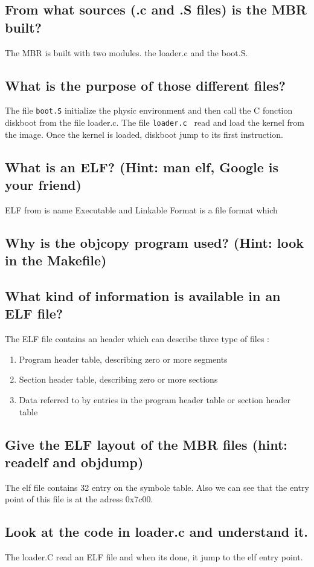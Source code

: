 \documentclass[10]{article}
\begin{document}
\subsection{From what sources (.c and .S files) is the MBR built?}
	The MBR is built  with two modules. 
	the loader.c and the  boot.S.
	
\subsection{What is the purpose of those different files?}
	The file   \texttt{boot.S}  initialize the physic environment and then call the C fonction diskboot from the file loader.c.
	The file  \texttt{loader.c } read and load the kernel from the image. Once the kernel is loaded, diskboot jump to its first instruction.
\subsection{What is an ELF? (Hint: man elf, Google is your friend)}
	ELF  from is name Executable and Linkable Format is a file format which 
\subsection{Why is the objcopy program used? (Hint: look in the Makefile)}

\subsection{What kind of information is available in an ELF file?}
The ELF file contains an header which can describe three type of files : 
\begin{enumerate}
	 \item
	Program header table, describing zero or more segments
	\item
	Section header table, describing zero or more sections
	\item
	Data referred to by entries in the program header table or section header table
\end{enumerate}
\subsection{Give the ELF layout of the MBR files (hint: readelf and objdump)}
The elf file contains 32 entry on the symbole table. Also we can see that the entry point of this file is at the adress  0x7c00.
\subsection{Look at the code in loader.c and understand it.}
The loader.C read an ELF file and when its done, it jump to the elf entry point.
\end{document}
